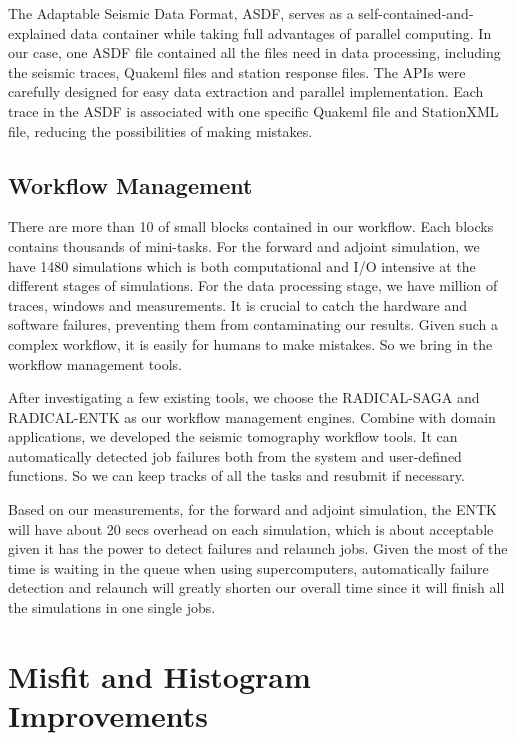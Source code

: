 \documentclass[extra,mreferee]{gji}
\begin{document}
The Adaptable Seismic Data Format, ASDF, serves as a self-contained-and-explained data container while taking full advantages of parallel computing. In our case, one ASDF file contained all the files need in data processing, including the seismic traces, Quakeml files and station response files. The APIs were carefully designed for easy data extraction and parallel implementation. Each trace in the ASDF is associated with one specific Quakeml file and StationXML file, reducing the possibilities of making mistakes.

\citep{krischer2016adaptable}

\subsection{Workflow Management}

There are more than 10 of small blocks contained in our workflow. Each blocks contains thousands of mini-tasks. For the forward and adjoint simulation, we have 1480 simulations which is both computational and I/O intensive at the different stages of simulations. For the data processing stage, we have million of traces, windows and measurements. It is crucial to catch the hardware and software failures, preventing them from contaminating our results. Given such a complex workflow, it is easily for humans to make mistakes. So we bring in the workflow management tools.

After investigating a few existing tools, we choose the RADICAL-SAGA and RADICAL-ENTK as our workflow management engines. Combine with domain applications, we developed the seismic tomography workflow tools. It can automatically detected job failures both from the system and user-defined functions. So we can keep tracks of all the tasks and resubmit if necessary.

Based on our measurements, for the forward and adjoint simulation, the ENTK will have about 20 secs overhead on each simulation, which is about acceptable given it has the power to detect failures and relaunch jobs. Given the most of the time is waiting in the queue when using supercomputers, automatically failure detection and relaunch will greatly shorten our overall time since it will finish all the simulations in one single jobs.


\section{Misfit and Histogram Improvements}
\end{document}
